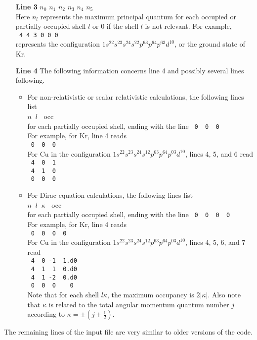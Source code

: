 \documentclass[11pt]{article}
\begin{document}
\begin{itemize}
	\item[{\bf{Line 3}}]	$n_0$    $n_1$    $n_2$     $n_3$   $n_4$     $n_5$ \\
	Here $n_l$ represents the maximum principal quantum for each occupied or
	partially occupied shell $l$ or 0 if the shell $l$ is not relevant. For example, \\
	\verb# 4 4 3 0 0 0 #\\
	represents the configuration $1s^22s^23s^24s^22p^63p^64p^63d^{10}$, or the
	ground state of Kr.
	\item[{\bf{Line 4}}]
	The following information concerns line 4 and possibly several lines following.
	\begin{itemize}
	\item For non-relativistic or scalar relativistic calculations,  the following
	lines list \\
	$n \;\;  l \;\; $   occ  \\
	for each partially occupied shell, ending with the line
	\verb^ 0  0  0 ^ \\
	For example, for Kr, line 4 reads\\
	 \verb^ 0  0  0 ^ \\
	 For Cu in the configuration  $1s^22s^23s^24s^12p^63p^64p^03d^{10}$,
	 lines 4, 5, and 6 read\\
	  \verb^ 4  0  1 ^ \\
	   \verb^ 4  1  0 ^ \\
	    \verb^ 0  0  0 ^ \\
	\item For Dirac equation calculations, the following lines list \\
	$n \;\;  l \;\; \kappa  \;\;$ occ \\
	for each partially occupied shell, ending with the line
	\verb^ 0  0  0  0^ \\
		For example, for Kr, line 4 reads\\
	 \verb^ 0  0  0  0 ^ \\
	 For Cu in the configuration  $1s^22s^23s^24s^12p^63p^64p^03d^{10}$,
	 lines 4, 5, 6, and 7 read\\
	  \verb^ 4  0 -1  1.d0 ^ \\
	   \verb^ 4  1  1  0.d0 ^ \\
	    \verb^ 4  1 -2  0.d0 ^ \\
	    \verb^ 0  0  0    0^ \\
	    Note that for each shell $l \kappa$,   the maximum occupancy is
	    $2|\kappa|$.   Also note that $\kappa$ is related to the total 
	    angular momentum quantum number $j$ according to
	     $\kappa = \pm \left(j+\frac{1}{2} \right)$.
	  \end{itemize}
	
	    
\end{itemize}
The remaining lines of the input file are very similar to older versions of
the code.
\end{document}
